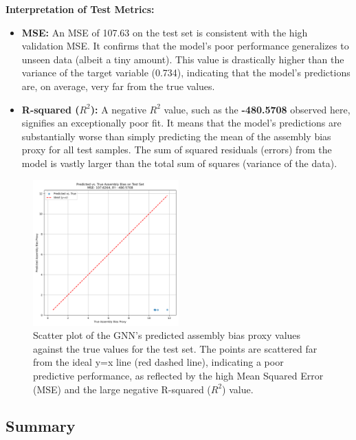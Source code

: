 \documentclass[twocolumn]{aastex631}
\begin{document}
\textbf{Interpretation of Test Metrics:}
\begin{itemize}
    \item \textbf{MSE:} An MSE of 107.63 on the test set is consistent with the high validation MSE. It confirms that the model's poor performance generalizes to unseen data (albeit a tiny amount). This value is drastically higher than the variance of the target variable (0.734), indicating that the model's predictions are, on average, very far from the true values.
    \item \textbf{R-squared ($R^2$):} A negative $R^2$ value, such as the \textbf{-480.5708} observed here, signifies an exceptionally poor fit. It means that the model's predictions are substantially worse than simply predicting the mean of the assembly bias proxy for all test samples. The sum of squared residuals (errors) from the model is vastly larger than the total sum of squares (variance of the data).
\end{itemize}

\begin{figure}[htbp]
    \centering
    \includegraphics[width=0.5\textwidth]{../input_files/plots/predicted_vs_true_bias_plot_2_1748137938.png}
    \caption{\label{fig:predicted_vs_true}Scatter plot of the GNN's predicted assembly bias proxy values against the true values for the test set. The points are scattered far from the ideal y=x line (red dashed line), indicating a poor predictive performance, as reflected by the high Mean Squared Error (MSE) and the large negative R-squared ($R^2$) value.}
\end{figure}

\subsection{Summary}
\end{document}
